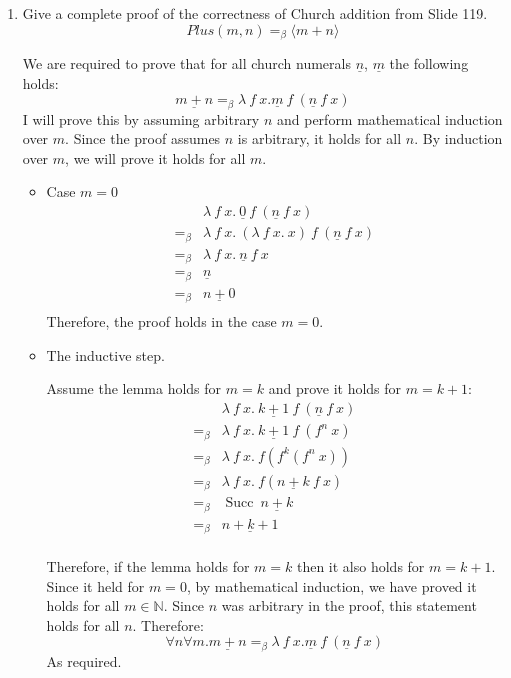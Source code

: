 \documentclass[10pt,\jkfside,a4paper]{article}
\begin{document}
\begin{enumerate}[label=(\alph*)]

\item Give a complete proof of the correctness of Church addition from
Slide 119.
\[
\mathit{Plus}(m, n) =_\beta \langle m + n \rangle
\]

\newcommand{\un}[1]{\ensuremath{\underline{#1}}}

We are required to prove that for all church numerals $\un{n}$, $\un{m}$
the following holds:
\[
\un{m + n} =_\beta \lambda\ f\ x. \un{m}\ f\ (\un{n}\ f\ x)
\]
I will prove this by assuming arbitrary $n$ and perform mathematical
induction over $m$. Since the proof assumes $n$ is arbitrary, it holds for
all $n$. By induction over $m$, we will prove it holds for all $m$.

\begin{itemize}

\item Case $m = 0$
\begin{align*}
& \lambda\ f\ x.\ \underline{0}\ f\ (\underline{n}\ f\ x) \\
=_{\beta}& \lambda\ f\ x.\ (\lambda\ f\ x.\ x)\ f\ (\underline{n}\ f\ x) \\
=_{\beta}& \lambda\ f\ x.\ \underline{n}\ f\ x \\
=_{\beta}& \underline{n} \\
=_{\beta}& \underline{n + 0} \\
\end{align*}
Therefore, the proof holds in the case $m = 0$.

\item The inductive step.

Assume the lemma holds for $m = k$ and prove it
holds for $m = k + 1$:
\begin{align*}
&
\lambda\ f\ x.\ \underline{k + 1}\ f\ (\underline{n}\ f\ x) \\
=_{\beta}&
\lambda\ f\ x.\ \underline{k + 1}\ f\ (f^n\ x) \\
=_{\beta}&
\lambda\ f\ x.\ f(f^k(f^n\ x)) \\
=_{\beta}& \lambda\ f\ x.\ f(\underline{n + k}\ f\  x) \\
=_{\beta}& \mathop{Succ}\ \underline{n + k} \\
=_{\beta}& \underline{n + k + 1} \\
\end{align*}

Therefore, if the lemma holds for $m = k$ then it also holds for $m = k + 1$.
Since it held for $m = 0$, by mathematical induction, we have proved it
holds for all $m \in \mathbb{N}$. Since $n$ was arbitrary in the proof,
this statement holds for all $n$. Therefore:
\[
\forall n\forall m. \un{m + n} =_\beta \lambda\ f\ x. \un{m}\ f\ (\un{n}\ f\ x)
\]
As required.


\end{itemize}
\end{enumerate}
\end{document}
